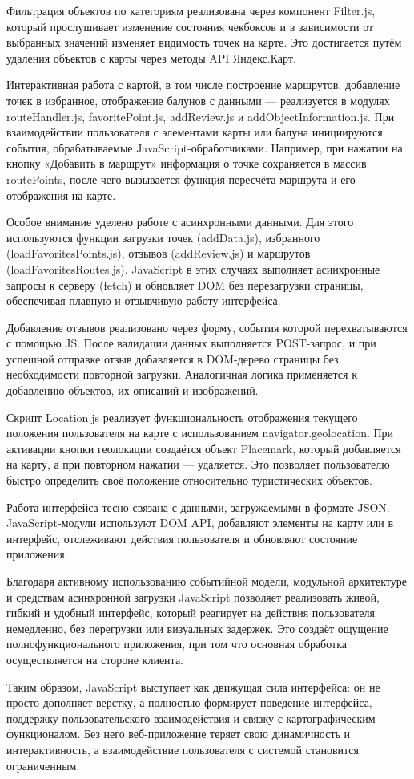 Фильтрация объектов по категориям реализована через компонент Filter.js, который прослушивает изменение состояния чекбоксов и в зависимости от выбранных значений изменяет видимость точек на карте. Это достигается путём удаления объектов с карты через методы API Яндекс.Карт.

Интерактивная работа с картой, в том числе построение маршрутов, добавление точек в избранное, отображение балунов с данными — реализуется в модулях routeHandler.js, favoritePoint.js, addReview.js и addObjectInformation.js. При взаимодействии пользователя с элементами карты или балуна инициируются события, обрабатываемые JavaScript-обработчиками. Например, при нажатии на кнопку «Добавить в маршрут» информация о точке сохраняется в массив routePoints, после чего вызывается функция пересчёта маршрута и его отображения на карте.

Особое внимание уделено работе с асинхронными данными. Для этого используются функции загрузки точек (addData.js), избранного (loadFavoritesPoints.js), отзывов (addReview.js) и маршрутов (loadFavoritesRoutes.js). JavaScript в этих случаях выполняет асинхронные запросы к серверу (fetch) и обновляет DOM без перезагрузки страницы, обеспечивая плавную и отзывчивую работу интерфейса.

Добавление отзывов реализовано через форму, события которой перехватываются с помощью JS. После валидации данных выполняется POST-запрос\cite{b23}, и при успешной отправке отзыв добавляется в DOM-дерево страницы без необходимости повторной загрузки. Аналогичная логика применяется к добавлению объектов, их описаний и изображений.

Скрипт Location.js реализует функциональность отображения текущего положения пользователя на карте с использованием navigator.geolocation. При активации кнопки геолокации создаётся объект Placemark, который добавляется на карту, а при повторном нажатии — удаляется. Это позволяет пользователю быстро определить своё положение относительно туристических объектов.

Работа интерфейса тесно связана с данными, загружаемыми в формате JSON. JavaScript-модули используют DOM API, добавляют элементы на карту или в интерфейс, отслеживают действия пользователя и обновляют состояние приложения.

Благодаря активному использованию событийной модели, модульной архитектуре\cite{b24} и средствам асинхронной загрузки JavaScript позволяет реализовать живой, гибкий и удобный интерфейс, который реагирует на действия пользователя немедленно, без перегрузки или визуальных задержек. Это создаёт ощущение полнофункционального приложения, при том что основная обработка осуществляется на стороне клиента.

Таким образом, JavaScript выступает как движущая сила интерфейса: он не просто дополняет верстку, а полностью формирует поведение интерфейса, поддержку пользовательского взаимодействия и связку с картографическим функционалом. Без него веб-приложение теряет свою динамичность и интерактивность, а взаимодействие пользователя с системой становится ограниченным.